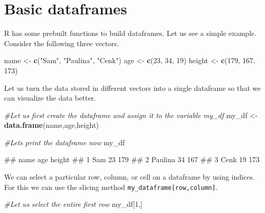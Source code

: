 \documentclass[
]{book}
\newenvironment{Shaded}{\begin{snugshade}}{\end{snugshade}}
\newcommand{\CommentTok}[1]{\textcolor[rgb]{0.56,0.35,0.01}{\textit{#1}}}
\newcommand{\DecValTok}[1]{\textcolor[rgb]{0.00,0.00,0.81}{#1}}
\newcommand{\FunctionTok}[1]{\textcolor[rgb]{0.13,0.29,0.53}{\textbf{#1}}}
\newcommand{\NormalTok}[1]{#1}
\newcommand{\OtherTok}[1]{\textcolor[rgb]{0.56,0.35,0.01}{#1}}
\newcommand{\StringTok}[1]{\textcolor[rgb]{0.31,0.60,0.02}{#1}}
\begin{document}
\section{Basic dataframes}\label{basic-dataframes}

R has some prebuilt functions to build dataframes. Let us see a simple example. Consider the following three vectors.

\begin{Shaded}
\begin{Highlighting}[]
\NormalTok{name }\OtherTok{\textless{}{-}} \FunctionTok{c}\NormalTok{(}\StringTok{"Sam"}\NormalTok{, }\StringTok{"Paulina"}\NormalTok{, }\StringTok{"Cenk"}\NormalTok{)}
\NormalTok{age }\OtherTok{\textless{}{-}} \FunctionTok{c}\NormalTok{(}\DecValTok{23}\NormalTok{, }\DecValTok{34}\NormalTok{, }\DecValTok{19}\NormalTok{)}
\NormalTok{height }\OtherTok{\textless{}{-}} \FunctionTok{c}\NormalTok{(}\DecValTok{179}\NormalTok{, }\DecValTok{167}\NormalTok{, }\DecValTok{173}\NormalTok{)}
\end{Highlighting}
\end{Shaded}

Let us turn the data stored in different vectors into a single dataframe so that we can visualize the data better.

\begin{Shaded}
\begin{Highlighting}[]
\CommentTok{\#Let us first create the dataframe and assign it to the variable my\_df}
\NormalTok{my\_df }\OtherTok{\textless{}{-}} \FunctionTok{data.frame}\NormalTok{(name,age,height)}

\CommentTok{\#Let\textquotesingle{}s print the dataframe now}
\NormalTok{my\_df}
\end{Highlighting}
\end{Shaded}

\begin{Shaded}
\begin{Highlighting}[]
\NormalTok{\#\#      name age height}
\NormalTok{\#\# 1     Sam  23    179}
\NormalTok{\#\# 2 Paulina  34    167}
\NormalTok{\#\# 3    Cenk  19    173}
\end{Highlighting}
\end{Shaded}

We can select a particular row, column, or cell on a dataframe by using indices. For this we can use the slicing method \texttt{my\_dataframe{[}row,column{]}}.

\begin{Shaded}
\begin{Highlighting}[]
\CommentTok{\#Let us select the entire first row }
\NormalTok{my\_df[}\DecValTok{1}\NormalTok{,]}
\end{Highlighting}
\end{Shaded}
\end{document}
